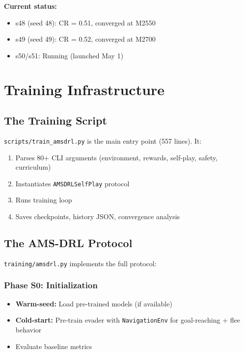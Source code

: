 \documentclass[11pt,a4paper]{report}
\begin{document}
\textbf{Current status:}
\begin{itemize}
    \item s48 (seed 48): CR = 0.51, converged at M2550
    \item s49 (seed 49): CR = 0.52, converged at M2700
    \item s50/s51: Running (launched May 1)
\end{itemize}

\chapter{Training Infrastructure}
\label{chap:infrastructure}

\section{The Training Script}

\texttt{scripts/train\_amsdrl.py} is the main entry point (557 lines). It:

\begin{enumerate}
    \item Parses 80+ CLI arguments (environment, rewards, self-play, safety, curriculum)
    \item Instantiates \texttt{AMSDRLSelfPlay} protocol
    \item Runs training loop
    \item Saves checkpoints, history JSON, convergence analysis
\end{enumerate}

\section{The AMS-DRL Protocol}

\texttt{training/amsdrl.py} implements the full protocol:

\subsection{Phase S0: Initialization}
\begin{itemize}
    \item \textbf{Warm-seed:} Load pre-trained models (if available)
    \item \textbf{Cold-start:} Pre-train evader with \texttt{NavigationEnv} for goal-reaching + flee behavior
    \item Evaluate baseline metrics
\end{itemize}
\end{document}
